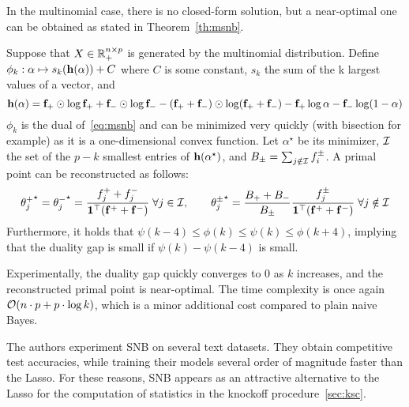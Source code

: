 In the multinomial case, there is no closed-form solution, but a near-optimal one can be obtained as
stated in Theorem~\ref{th:msnb}.
\begin{theorem}\label{th:msnb}
    Suppose that $X \in \mathbb{R}_+^{n \times p}$ is generated by the multinomial distribution.
    Define $\phi_k : \alpha \mapsto s_k(\mathbf{h}(\alpha)) + C$ where $C$ is some constant,
    $s_k$ the sum of the k largest values of a vector, and
    \begin{equation*}
            \mathbf{h}(\alpha) = \mathbf{f}_+ \odot \log \mathbf{f}_+ + \mathbf{f}_- \odot \log \mathbf{f}_-
                - (\mathbf{f}_+ + \mathbf{f}_-) \odot \log (\mathbf{f}_+ + \mathbf{f}_-)
                - \mathbf{f}_+ \log \alpha - \mathbf{f}_- \log (1 - \alpha)
    \end{equation*}
    $\phi_k$ is the dual of~\ref{eq:msnb} and can be minimized very quickly (with bisection for example)
    as it is a one-dimensional convex function.
    Let $\alpha^\star$ be its minimizer, $\mathcal{I}$ the set of the $p - k$ smallest entries of
    $\mathbf{h}(\alpha^\star)$, and $B_\pm = \sum_{j \notin \mathcal{I}} f_i^\pm$.
    A primal point can be reconstructed as follows:
    \begin{equation*}
        {\theta^+_j}^\star = {\theta^-_j}^\star = \frac{f_j^+ + f_j^-}{\mathbf{1}^\top(\mathbf{f}^+ + \mathbf{f}^-)}
        \;\forall j \in \mathcal{I}
        ,\qquad
        {\theta^\pm_j}^\star = \frac{B_+ + B_-}{B_\pm}\frac{f^\pm_j}{\mathbf{1}^\top(\mathbf{f}^+ + \mathbf{f}^-)}
        \;\forall j \notin \mathcal{I}
    \end{equation*}
    Furthermore, it holds that $\psi(k - 4) \leq \phi(k) \leq \psi(k) \leq \phi(k + 4)$,
    implying that the duality gap is small if $\psi(k) - \psi(k - 4)$ is small.
\end{theorem}
Experimentally, the duality gap quickly converges to $0$ as $k$ increases,
and the reconstructed primal point is near-optimal.
The time complexity is once again $\mathcal{O}(n \cdot p + p \cdot \log k)$,
which is a minor additional cost compared to plain naive Bayes.

The authors experiment SNB on several text datasets.
They obtain competitive test accuracies,
while training their models several order of magnitude faster than the Lasso.
For these reasons, SNB appears as an attractive alternative to the Lasso for the computation of statistics
in the knockoff procedure~\ref{sec:ksc}.
